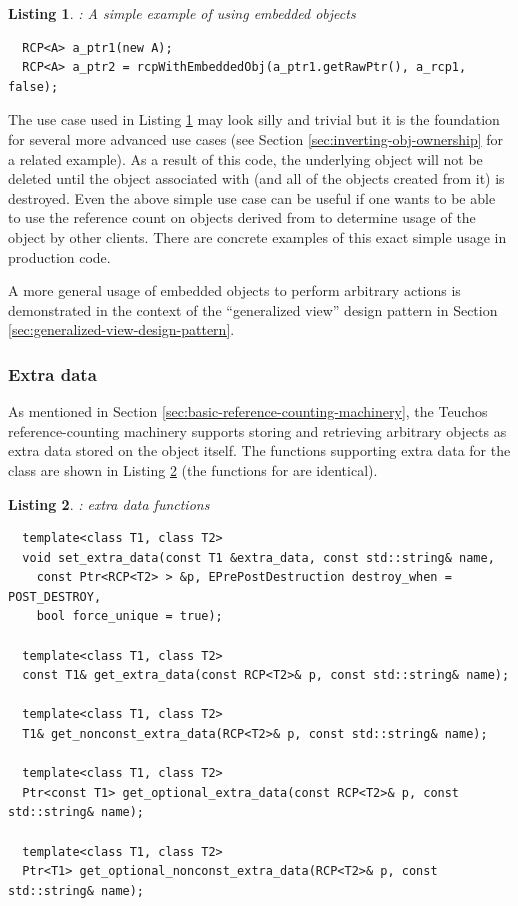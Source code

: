 \documentclass[pdf,ps2pdf,11pt]{SANDreport}
\newtheorem{listing}{Listing}
\begin{document}
{}\begin{listing}: A simple example of using embedded objects
\label{listsing:embedded-obj-simple-rcp-clone}
{\small\begin{verbatim}
  RCP<A> a_ptr1(new A);
  RCP<A> a_ptr2 = rcpWithEmbeddedObj(a_ptr1.getRawPtr(), a_rcp1, false);
\end{verbatim}}
\end{listing}


The use case used in Listing
{}\ref{listsing:embedded-obj-simple-rcp-clone} may look silly and
trivial but it is the foundation for several more advanced use cases
(see Section {}\ref{sec:inverting-obj-ownership} for a related
example).  As a result of this code, the underlying {} object
will not be deleted until the {} object associated
with {} (and all of the {} objects created from
it) is destroyed.  Even the above simple use case can be useful if one
wants to be able to use the reference count on {} objects
derived from {} to determine usage of the object by other
clients.  There are concrete examples of this exact simple usage in
production code.

A more general usage of embedded objects to perform arbitrary actions
is demonstrated in the context of the ``generalized view'' design
pattern in Section {}\ref{sec:generalized-view-design-pattern}.


%
{}\subsubsection{Extra data}
\label{sec:extra-data}
%

As mentioned in Section
{}\ref{sec:basic-reference-counting-machinery}, the Teuchos
reference-counting machinery supports storing and retrieving arbitrary
objects as extra data stored on the {} object itself.
The functions supporting extra data for the {} class are
shown in Listing {}\ref{listing:RCP-extra-data} (the functions for
{} are identical).

\begin{listing}:  {} extra data functions \\
\label{listing:RCP-extra-data}
{\small\begin{verbatim}
  template<class T1, class T2>
  void set_extra_data(const T1 &extra_data, const std::string& name,
    const Ptr<RCP<T2> > &p, EPrePostDestruction destroy_when = POST_DESTROY,
    bool force_unique = true);
  
  template<class T1, class T2> 
  const T1& get_extra_data(const RCP<T2>& p, const std::string& name);
  
  template<class T1, class T2>
  T1& get_nonconst_extra_data(RCP<T2>& p, const std::string& name);
  
  template<class T1, class T2>
  Ptr<const T1> get_optional_extra_data(const RCP<T2>& p, const std::string& name);
  
  template<class T1, class T2>
  Ptr<T1> get_optional_nonconst_extra_data(RCP<T2>& p, const std::string& name);
\end{verbatim}}
\end{listing}
\end{document}
